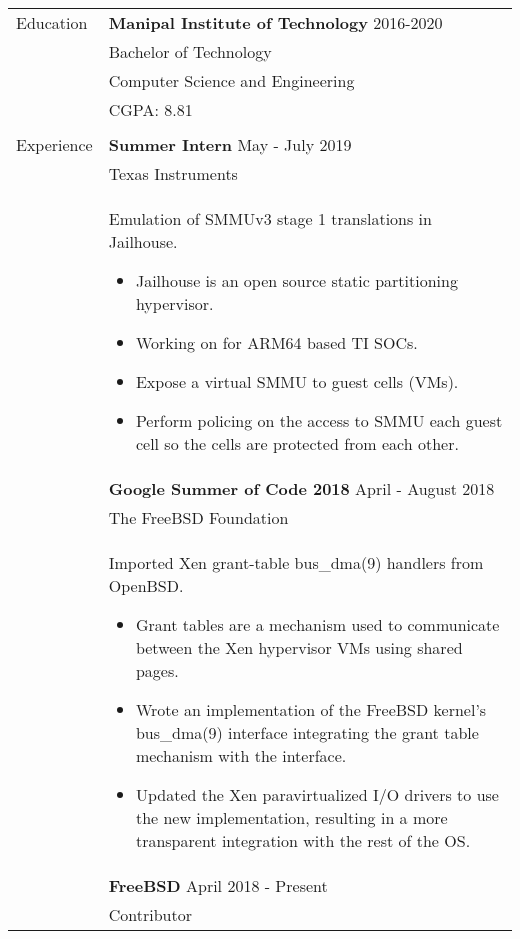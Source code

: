 \documentclass[letterpaper,11pt,oneside]{article}
\begin{document}
\noindent \begin{tabularx}{\textwidth}{l X}
 \Large{Education} & \textbf{Manipal Institute of Technology} \hfill 2016-2020  \\
     & Bachelor of Technology \\
     & Computer Science and Engineering \\
     &  CGPA: 8.81\\
     & \\
 \Large{Experience} & \textbf{Summer Intern} \hfill May - July 2019 \\
    & Texas Instruments \\
    & Emulation of SMMUv3 stage 1 translations in Jailhouse. \vspace{-1ex}
    \begin{itemize}[label={--}]
    \setlength\itemsep{-0.25em}
        \item Jailhouse is an open source static partitioning hypervisor.
        \item Working on for ARM64 based TI SOCs.
        \item Expose a virtual SMMU to guest cells (VMs).
        \item  Perform policing on the access to SMMU each guest cell so the cells are protected from each other.
    \end{itemize} \\
    & \textbf{Google Summer of Code 2018} \hfill April - August 2018 \\
    & The FreeBSD Foundation \\
    & Imported Xen grant-table bus\_dma(9) handlers from OpenBSD. \vspace{-1ex}
    \begin{itemize}[label={--}]
    \setlength\itemsep{-0.25em}
        \item Grant tables are a mechanism used to communicate between the Xen hypervisor VMs using shared pages.
        \item Wrote an implementation of the FreeBSD kernel's bus\_dma(9) interface integrating the grant table mechanism with the interface.
        \item Updated the Xen paravirtualized I/O drivers to use the new implementation, resulting in a more transparent integration with the rest of the OS.
    \end{itemize} \\
    & \textbf{FreeBSD} \hfill April 2018 - Present \\
    & Contributor \vspace{-1ex}

\end{tabularx}
\end{document}
